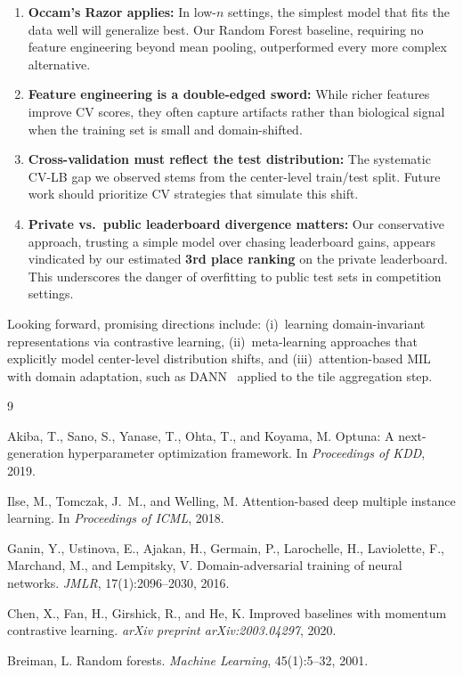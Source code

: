 \documentclass[11pt,a4paper]{article}
\begin{document}
\begin{enumerate}
    \item \textbf{Occam's Razor applies:} In low-$n$ settings, the simplest model that fits the data well will generalize best. Our Random Forest baseline, requiring no feature engineering beyond mean pooling, outperformed every more complex alternative.

    \item \textbf{Feature engineering is a double-edged sword:} While richer features improve CV scores, they often capture artifacts rather than biological signal when the training set is small and domain-shifted.

    \item \textbf{Cross-validation must reflect the test distribution:} The systematic CV-LB gap we observed stems from the center-level train/test split. Future work should prioritize CV strategies that simulate this shift.

    \item \textbf{Private vs.\ public leaderboard divergence matters:} Our conservative approach, trusting a simple model over chasing leaderboard gains, appears vindicated by our estimated \textbf{3rd place ranking} on the private leaderboard. This underscores the danger of overfitting to public test sets in competition settings.
\end{enumerate}

Looking forward, promising directions include: (i)~learning domain-invariant representations via contrastive learning, (ii)~meta-learning approaches that explicitly model center-level distribution shifts, and (iii)~attention-based MIL with domain adaptation, such as DANN~\citep{ganin2016domain} applied to the tile aggregation step.

\newpage

\begin{thebibliography}{9}

Akiba, T., Sano, S., Yanase, T., Ohta, T., and Koyama, M.
\newblock Optuna: A next-generation hyperparameter optimization framework.
\newblock In \emph{Proceedings of KDD}, 2019.

Ilse, M., Tomczak, J.~M., and Welling, M.
\newblock Attention-based deep multiple instance learning.
\newblock In \emph{Proceedings of ICML}, 2018.

Ganin, Y., Ustinova, E., Ajakan, H., Germain, P., Larochelle, H., Laviolette, F., Marchand, M., and Lempitsky, V.
\newblock Domain-adversarial training of neural networks.
\newblock \emph{JMLR}, 17(1):2096--2030, 2016.

Chen, X., Fan, H., Girshick, R., and He, K.
\newblock Improved baselines with momentum contrastive learning.
\newblock \emph{arXiv preprint arXiv:2003.04297}, 2020.

Breiman, L.
\newblock Random forests.
\newblock \emph{Machine Learning}, 45(1):5--32, 2001.

\end{thebibliography}
\end{document}
